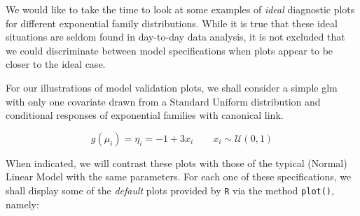 \documentclass[a4paper,12pt]{article}\usepackage[]{graphicx}\usepackage[]{color}
\def\op{\left(}
\def\cp{\right)}
\begin{document}

\begin{center}
\bigskip

\bigskip

\bigskip

\bigskip

\bigskip

\bigskip


\bigskip

\bigskip

\bigskip
\end{center}



\setlength{\parskip}{1ex plus 0.5ex minus 0.2ex}
\parindent=0cm
\setlength{\parskip}{1ex plus 0.5ex minus 0.2ex}
\linespread{1.1}
\sloppy

We would like to take the time to look at some examples of \emph{ideal} diagnostic plots for different exponential family distributions. While it is true that these ideal situations are seldom found in day-to-day data analysis, it is not excluded that we could discriminate between model specifications when plots appear to be closer to the ideal case.

For our illustrations of model validation plots, we shall consider a simple glm with only one covariate drawn from a Standard Uniform distribution and conditional responses of exponential families with canonical link. 

\begin{equation}
g(\mu_i) = \eta_i  = - 1 + 3 x_i \qquad x_i \sim \mathcal{U}\op 0 , 1 \cp 
\end{equation}

When indicated, we will contrast these plots with those of the typical (Normal) Linear Model with the same parameters. For each one of these specifications, we shall display some of the \emph{default} plots provided by \texttt{R} via the method \texttt{plot()}, namely: 
\end{document}
